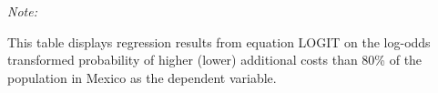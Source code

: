 \begin{table}[htbp!]
\begin{adjustbox}{width = 1\textwidth, max height = 0.95\textheight, center}
\begin{threeparttable}[b]
         \begin{tablenotes}\item \medskip \textit{Note:}
            \item This table displays regression results from equation LOGIT on the log-odds transformed probability of higher (lower) additional costs than 80\% of the population in Mexico as the dependent variable. 
         \end{tablenotes}
      \end{threeparttable}
   \end{adjustbox}
\end{table}


